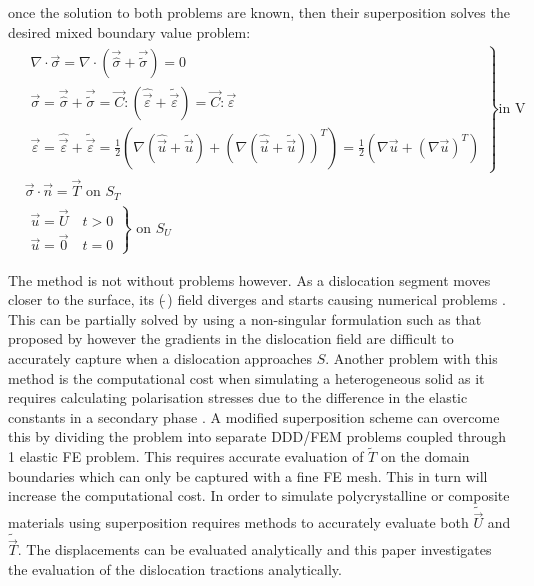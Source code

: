 \documentclass[11pt]{iopart}
\begin{document}
%
once the solution to both problems are known, then their superposition solves the desired mixed boundary value problem:
%
\begin{align}
     & \left.
    \begin{array}{l}
        \nabla\cdot\vec{\sigma}=\nabla\cdot\left(\vec{\hat{\sigma}} +\vec{\tilde{\sigma}}\right) = 0                                                              \\
        \vec{\sigma} =\vec{\hat{\sigma}}+\vec{\tilde{\sigma}}= \vec{C}:\left(\hat{\vec{\varepsilon}}+\tilde{\vec{\varepsilon}}\right)=\vec{C}:{\vec{\varepsilon}} \\
        \vec{\varepsilon}=\hat{\vec{\varepsilon}}+\tilde{\vec{\varepsilon}}=\frac{1}{2}\left(\nabla(\hat{\vec{u}}+\tilde{\vec{u}})+\left(\nabla(\hat{\vec{u}}+\tilde{\vec{u}})\right)^T\right) =\frac{1}{2}\left(\nabla\vec{u}+(\nabla\vec{u})^{T}\right)
    \end{array}
    \right\}\textrm{in V}                                    \\
     & \vec{\sigma}\cdot\vec{n} = \vec{T}  \textrm{ on } S_T \\
     & \left.
    \begin{array}{l}
        \vec{u} = \vec{U} \quad t>0 \\
        \vec{u} = \vec{0} \quad t=0
    \end{array}
    \right\} \textrm{ on } S_U
    \label{eq:ubc}
\end{align}

The method is not without problems however. As a dislocation segment moves closer to the surface, its ($\tilde{~}$) field diverges and starts causing numerical problems \cite{boundary_problems_in_dd}. This can be partially solved by using a non-singular formulation such as that proposed by \citet{Cai2006} however the gradients in the dislocation field are difficult to accurately capture when a dislocation approaches $S$. Another problem with this method is the computational cost when simulating a heterogeneous solid as it requires calculating polarisation stresses due to the difference in the elastic constants in a secondary phase \cite{superposition_scheme0,boundary_problems_in_dd,ddd_precipitate}. A modified superposition scheme \cite{ODay2004} can overcome this by dividing the problem into separate DDD/FEM problems coupled through 1 elastic FE problem. This requires accurate evaluation of $\tilde{T}$ on the domain boundaries which can only be captured with a fine FE mesh. This in turn will increase the computational cost. In order to simulate polycrystalline or composite materials using superposition requires methods to accurately evaluate both $\tilde{\vec{U}}$ and $\tilde{\vec{T}}$. The displacements can be evaluated analytically \cite{ddd_disp} and this paper investigates the evaluation of the dislocation tractions analytically.
\end{document}
